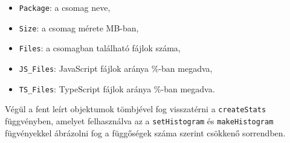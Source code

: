 \begin{itemize}
	\item \texttt{Package}: a csomag neve,
	\item \texttt{Size}: a csomag mérete MB-ban,
	\item \texttt{Files}: a csomagban található fájlok száma,
	\item \texttt{JS\_Files}: JavaScript fájlok aránya \%-ban megadva,
	\item \texttt{TS\_Files}: TypeScript fájlok aránya \%-ban megadva.
\end{itemize}

Végül a fent leírt objektumok tömbjével fog visszatérni a \texttt{createStats} függvényben, amelyet felhasználva az a \texttt{setHistogram} és \texttt{makeHistogram} fügvényekkel ábrázolni fog a függőségek száma szerint csökkenő sorrendben.

